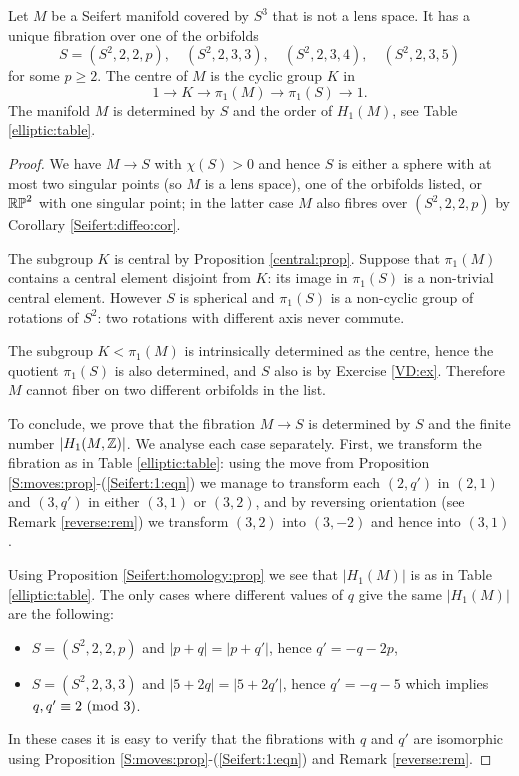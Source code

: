 \begin{prop} \label{elliptic:center:prop}
Let $M$ be a Seifert manifold covered by $S^3$ that is not a lens space. It has a unique fibration over one of the orbifolds
$$S = (S^2,2,2,p), \quad (S^2,2,3,3), \quad (S^2,2,3,4), \quad (S^2,2,3,5)$$
for some $p\geqslant 2$. The centre of $M$ is the cyclic group $K$ in 
$$1 \longrightarrow K \longrightarrow \pi_1(M) \longrightarrow \pi_1(S)\longrightarrow 1.$$
The manifold $M$ is determined by $S$ and the order of $H_1(M)$, see Table \ref{elliptic:table}.
\end{prop}
\begin{proof}
We have $M\to S$ with $\chi(S)>0$ and hence $S$ is either a sphere with at most two singular points (so $M$ is a lens space), one of the orbifolds listed, or $\mathbb{RP}^2$ with one singular point; in the latter case $M$ also fibres over $(S^2,2,2,p)$ by Corollary \ref{Seifert:diffeo:cor}.

The subgroup $K$ is central by Proposition \ref{central:prop}. Suppose that $\pi_1(M)$ contains a central element disjoint from $K$: its image in $\pi_1(S)$ is a non-trivial central element. However $S$ is spherical and $\pi_1(S)$ is a non-cyclic group of rotations of $S^2$: two rotations with different axis never commute.

The subgroup $K<\pi_1(M)$ is intrinsically determined as the centre, hence the quotient $\pi_1(S)$ is also determined, and $S$ also is by
Exercise \ref{VD:ex}.
Therefore $M$ cannot fiber on two different orbifolds in the list.

To conclude, we prove that the fibration $M\to S$ is determined by $S$ and the finite number $|H_1(M,\mathbb{Z})|$. We analyse each case separately. First, we transform the fibration as in Table \ref{elliptic:table}: using the move from Proposition \ref{S:moves:prop}-(\ref{Seifert:1:eqn}) we manage to transform each $(2,q')$ in $(2,1)$ and $(3,q')$ in either $(3,1)$ or $(3,2)$, and by reversing orientation (see Remark \ref{reverse:rem}) we transform $(3,2)$ into $(3,-2)$ and hence into $(3,1)$.

Using Proposition \ref{Seifert:homology:prop} we see that $|H_1(M)|$ is as in Table \ref{elliptic:table}. The only cases where different values of $q$ give the same $|H_1(M)|$ are the following:
\begin{itemize}
\item $S=(S^2,2,2,p)$ and $|p+q|=|p+q'|$, hence $q'=-q-2p$, 
\item $S=(S^2,2,3,3)$ and $|5+2q| = |5+2q'|$, hence $q' = -q-5$ which implies $q,q' \equiv 2 \ ({\rm mod}\ 3)$.
\end{itemize}
In these cases it is easy to verify that the fibrations with $q$ and $q'$ are isomorphic using Proposition \ref{S:moves:prop}-(\ref{Seifert:1:eqn}) and Remark \ref{reverse:rem}.


\end{proof}
